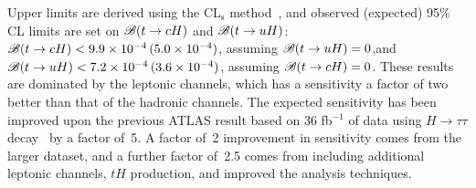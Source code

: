 \documentclass[PAPER, coverpage, atlasdraft=true, texlive=2016, UKenglish]{\ATLASLATEXPATH atlasdoc}
\begin{document}
Upper limits are derived using the CL$_{\textrm{s}}$ method~\cite{Junk:1999kv,Read:2002hq}, and  
observed (expected) 95\% CL limits are set on $\mathscr{B}(t\to cH)$ and $\mathscr{B}(t\to uH)$:
$\mathscr{B}(t\to cH)<9.9 \times 10^{-4}\,(5.0 \times 10^{-4})$, assuming $\mathscr{B}(t\to uH)=0$,and $\mathscr{B}(t\to uH)<7.2 \times 10^{-4}\,(3.6 \times 10^{-4})$, assuming $\mathscr{B}(t\to cH)=0$.
These results are dominated by the leptonic channels, which has a sensitivity a factor of two better than that of the hadronic channels.
The expected sensitivity has been improved upon the previous ATLAS result based on 36 fb$^{-1}$ of data using $H\to \tau\tau$ decay~\cite{fcnc36} by a factor of~5. A factor of~2 improvement in sensitivity comes from the larger dataset, and a further factor of~2.5 comes from including
additional leptonic channels, $tH$ production, and improved the analysis techniques.
\end{document}
